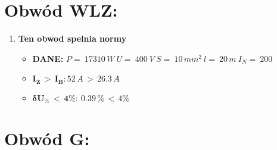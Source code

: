
\section{Obwód WLZ:}

\begin{enumerate}
\item \textcolor{Green}{\cmark} \textbf{Ten obwod spelnia normy} 
\begin{itemize}
\item[] \textbf{DANE: } \: $ P = \:17310\, W\: U = \:400\: V\: S = \:10\, mm^2\: l = \:20\, m\: I_N= \: $200
\item[\textcolor{Green}{\cmark}] $ \pmb{I_Z \, >  \, I_B: }52 \, A \, > \,26.3 \, A $
\item[\textcolor{Green}{\cmark}] $ \pmb{ \delta U_\% \, < \, 4\%:} \:0.39 \, \% \,< \, 4\% $
\end{itemize}
\end{enumerate}
\section{Obwód G:}

